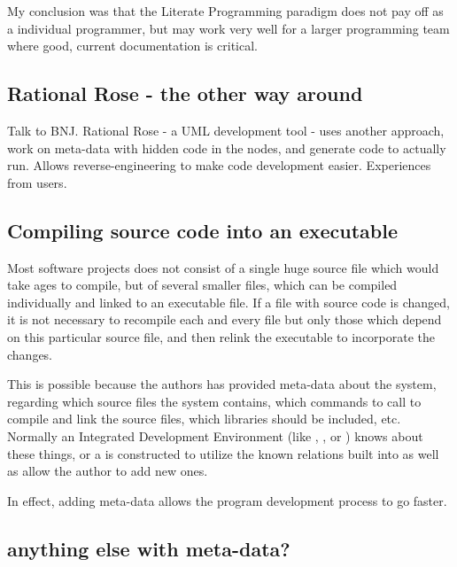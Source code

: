 My conclusion was that the Literate Programming paradigm does not pay
off as a individual programmer, but may work very well for a larger
programming team where good, current documentation is critical.

\subsection{Rational Rose - the other way around}
\label{sec:rational-rose}

\textsf{Talk to BNJ}.  Rational Rose - a UML development tool - uses
another approach, \textsf{work on meta-data with hidden code in the
  nodes, and generate code to actually run.  Allows
  reverse-engineering to make code development easier.
  Experiences from users}.  



\subsection{Compiling source code into an executable}
\label{sec:compiling-source-into-an-executable}

Most software projects does not consist of a single huge source file
which would take ages to compile, but of several smaller files, which
can be compiled individually and linked to an executable file.  If a
file with source code is changed, it is not necessary to recompile
each and every file but only those which depend on this particular
source file, and then relink the executable to incorporate the
changes.

This is possible because the authors has provided meta-data about the
system, regarding which source files the system contains, which
commands to call to compile and link the source files, which libraries
should be included, etc.  Normally an Integrated Development
Environment (like , , or ) knows about these things, or a
 is constructed
to utilize the known relations built into  as well
as allow the author to add new ones.

In effect, adding meta-data allows the program development process to
go faster.

\subsection{\textsf{anything else with meta-data?}}


